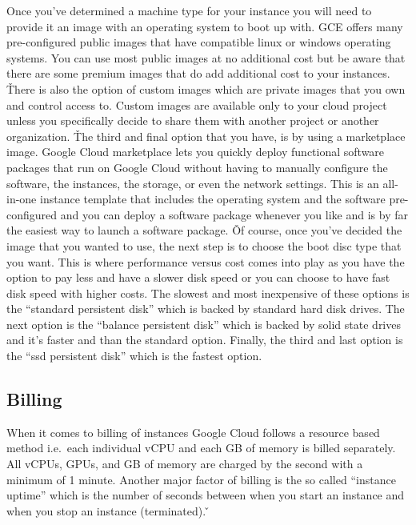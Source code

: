 Once you've determined a machine type for your instance you will need to provide it an image with an operating system
to boot up with. GCE offers many pre-configured public images that have compatible linux or windows operating systems.
You can use most public images at no additional cost but be aware that there are some premium images that do add
additional cost to your instances. \v

There is also the option of custom images which are private images that you own and control access to. Custom images
are available only to your cloud project unless you specifically decide to share them with another project or another
organization. \v

The third and final option that you have, is by using a marketplace image. Google Cloud marketplace lets you quickly
deploy functional software packages that run on Google Cloud without having to manually configure the software, the
instances, the storage, or even the network settings. This is an all-in-one instance template that includes the
operating system and the software pre-configured and you can deploy a software package whenever you like and is by
far the easiest way to launch a software package. \v

Of course, once you've decided the image that you wanted to use, the next step is to choose the boot disc type that
you want. This is where performance versus cost comes into play as you have the option to pay less and have a slower
disk speed or you can choose to have fast disk speed with higher costs. The slowest and most inexpensive of these
options is the ``standard persistent disk'' which is backed by standard hard disk drives. The next option is the
``balance persistent disk'' which is backed by solid state drives and it's faster and than the standard option.
Finally, the third and last option is the ``ssd persistent disk'' which is the fastest option.

\subsection{Billing}

When it comes to billing of instances Google Cloud follows a resource based method i.e.\ each individual vCPU and
each GB of memory is billed separately. All vCPUs, GPUs, and GB of memory are charged by the second with a minimum of
1 minute. Another major factor of billing is the so called ``instance uptime'' which is the number of seconds between
when you start an instance and when you stop an instance (terminated). \v

